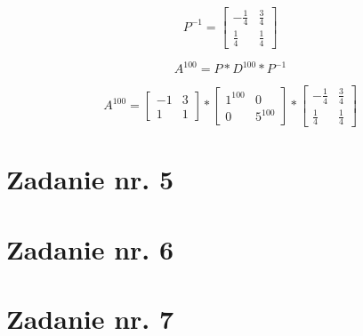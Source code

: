 \documentclass{article}
\begin{document}
\begin{equation} 
  P^{-1} = \begin{bmatrix} -\frac{1}{4} & \frac3{4}  \\[6pt]
    \frac{1}{4} & \frac{1}{4}  \end{bmatrix}
\end{equation}

\begin{equation} 
  A^{100} = P*D^{100}*P^{-1}
\end{equation}

\begin{equation} 
  A^{100} = \begin{bmatrix} -1 & 3  \\[6pt] 1 & 1  \end{bmatrix} * \begin{bmatrix} 1^{100} & 0  \\[6pt] 0 & 5^{100}  \end{bmatrix} * \begin{bmatrix} -\frac{1}{4} & \frac3{4}  \\[6pt]
    \frac{1}{4} & \frac{1}{4}  \end{bmatrix}
\end{equation}

\section{Zadanie nr. 5}

\section{Zadanie nr. 6}

\section{Zadanie nr. 7}
\end{document}
